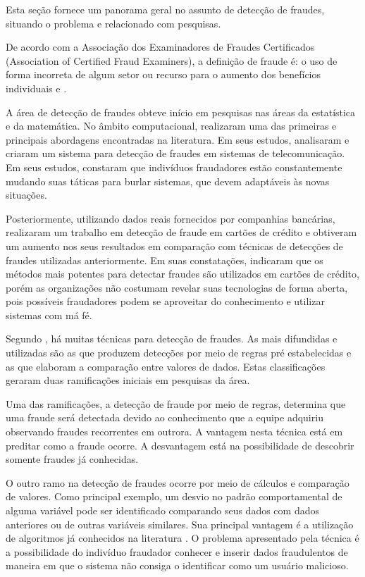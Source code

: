 \documentclass[smallextended]{svjour3}
\begin{document}
Esta seção fornece um panorama geral no assunto de detecção de fraudes, situando o problema e relacionado com pesquisas.

De acordo com a Associação dos Examinadores de Fraudes Certificados (Association of Certified Fraud Examiners), a definição de fraude é: o uso de forma incorreta de algum setor ou recurso para o aumento dos benefícios individuais \citep{Abdallah2016} e \citep{Allan2010}.

A área de detecção de fraudes obteve início em pesquisas nas áreas da estatística e da matemática. No âmbito computacional, \cite{Fawcett1997} realizaram uma das primeiras e principais abordagens encontradas na literatura. Em seus estudos, analisaram e criaram um sistema para detecção de fraudes em sistemas de telecomunicação. Em seus estudos, constaram que indivíduos fraudadores estão constantemente mudando suas táticas para burlar sistemas, que devem adaptáveis às novas situações.

Posteriormente, utilizando dados reais fornecidos por companhias bancárias, \cite{809570} realizaram um trabalho em detecção de fraude em cartões de crédito e obtiveram um aumento nos seus resultados em comparação com técnicas de detecções de fraudes utilizadas anteriormente. Em suas constatações, indicaram que os métodos mais potentes para detectar fraudes são utilizados em cartões de crédito, porém as organizações não costumam revelar suas tecnologias de forma aberta, pois possíveis fraudadores podem se aproveitar do conhecimento e utilizar sistemas com má fé.

Segundo \cite{Fawcett1997}, há muitas técnicas para detecção de fraudes. As mais difundidas e utilizadas são as que produzem detecções por meio de regras pré estabelecidas e as que elaboram a comparação entre valores de dados. Estas classificações geraram duas ramificações iniciais em pesquisas da área.

Uma das ramificações, a detecção de fraude por meio de regras, determina que uma fraude será detectada devido ao conhecimento que a equipe adquiriu observando fraudes recorrentes em outrora. A vantagem nesta técnica está em preditar como a fraude ocorre. A desvantagem está na possibilidade de descobrir somente fraudes já conhecidas.

O outro ramo na detecção de fraudes ocorre por meio de cálculos e comparação de valores. Como principal exemplo, um desvio no padrão comportamental de alguma variável pode ser identificado comparando seus dados com dados anteriores ou de outras variáveis similares. Sua principal vantagem é a utilização de algoritmos já conhecidos na literatura \citep{Fawcett1997}. O problema apresentado pela técnica é a possibilidade do indivíduo fraudador conhecer e inserir dados fraudulentos de maneira em que o sistema não consiga o identificar como um usuário malicioso.
\end{document}
